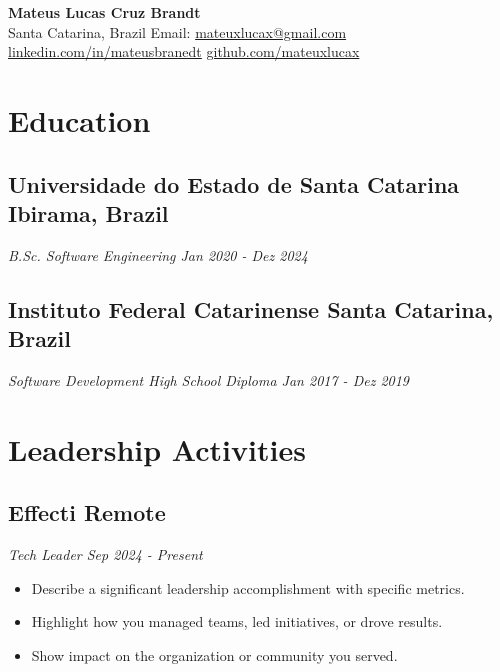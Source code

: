 \documentclass[a4paper,10pt]{article}
\begin{document}
\begin{center}
    {\LARGE \textbf{Mateus Lucas Cruz Brandt}} \\ [0.1cm]
    Santa Catarina, Brazil {\textbullet}
    Email: \href{mailto:mateuxlucax@gmail.com}{mateuxlucax@gmail.com} {\textbullet}
    \href{https://www.linkedin.com/in/mateusbrandt}{linkedin.com/in/mateusbranedt} {\textbullet}
    \href{https://github.com/mateuxlucax}{github.com/mateuxlucax}
\end{center}


\section{Education}
    \subsection*{\texorpdfstring{
        \textbf{Universidade do Estado de Santa Catarina} \hfill Ibirama, Brazil
        }{
        Universidade do Estado de Santa Catarina -- Ibirama, Brazil
        }}
    \textit{B.Sc. Software Engineering \hfill Jan 2020 - Dez 2024}

    \subsection*{\texorpdfstring{
        \textbf{Instituto Federal Catarinense} \hfill Santa Catarina, Brazil
        }{
        Instituto Federal Catarinense -- Santa Catarina, Brazil
        }}
    \textit{Software Development High School Diploma \hfill Jan 2017 - Dez 2019}

\section{Leadership Activities} 
    \subsection*{\texorpdfstring{
        \textbf{Effecti} \hfill Remote
        }{
        Effecti -- Remote
        }}
    \textit{Tech Leader \hfill Sep 2024 - Present}
        \begin{itemize}
            \item Describe a significant leadership accomplishment with specific metrics.
            \item Highlight how you managed teams, led initiatives, or drove results.
            \item Show impact on the organization or community you served.
        \end{itemize}
\end{document}
